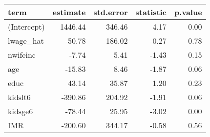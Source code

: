 \begin{tabular}{lrrrr}
  \hline
term & estimate & std.error & statistic & p.value \\ 
  \hline
(Intercept) & 1446.44 & 346.46 & 4.17 & 0.00 \\ 
  lwage\_hat & -50.78 & 186.02 & -0.27 & 0.78 \\ 
  nwifeinc & -7.74 & 5.41 & -1.43 & 0.15 \\ 
  age & -15.83 & 8.46 & -1.87 & 0.06 \\ 
  educ & 43.14 & 35.87 & 1.20 & 0.23 \\ 
  kidslt6 & -390.86 & 204.92 & -1.91 & 0.06 \\ 
  kidsge6 & -78.44 & 25.95 & -3.02 & 0.00 \\ 
  IMR & -200.60 & 344.17 & -0.58 & 0.56 \\ 
   \hline
\end{tabular}
